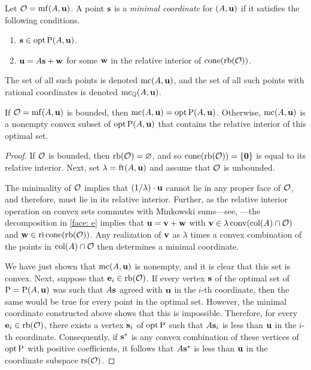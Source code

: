 \documentclass[11pt]{amsart}
\begin{document}
\begin{definition}
\label{mc: D} 
Let $\mathcal{O} = \operatorname{mf}(A, \mathbf{u})$.  A point $\mathbf{s}$ is a \emph{minimal coordinate} for $(A, \mathbf{u})$ if it satisfies the following conditions.
\begin{enumerate}
\item $\mathbf{s} \in \operatorname{opt} \mathrm{P}(A, \mathbf{u})$.
\item $\mathbf{u} = A \mathbf{s} + \mathbf{w}$ for some $\mathbf{w}$ in the relative interior of $\operatorname{cone} ( \operatorname{rb}(\mathcal{O}))$.  
\end{enumerate}

The set of all such points is denoted $\operatorname{mc}(A, \mathbf{u})$, and the set of all such points with rational coordinates is denoted $\operatorname{mc}_{\mathbb{Q}}(A, \mathbf{u})$.  
\end{definition}


\begin{proposition}  
\label{opt versus mc: P}  If $\mathcal{O} = \operatorname{mf}(A, \mathbf{u})$ is bounded, then $\operatorname{mc}(A, \mathbf{u}) = \operatorname{opt} \mathrm{P}(A, \mathbf{u})$.  Otherwise,  $\operatorname{mc}(A, \mathbf{u})$ is a nonempty convex subset of $\operatorname{opt} \mathrm{P}(A, \mathbf{u})$ that contains the relative interior of this optimal set. 
\end{proposition}

\begin{proof}    
If $\mathcal{O}$ is bounded, then $\operatorname{rb}(\mathcal{O}) = \varnothing$, and so $\operatorname{cone}( \operatorname{rb}(\mathcal{O})) = \{\mathbf{0} \}$ is equal to its relative interior.  Next, set $\lambda = \operatorname{ft}(A, \mathbf{u})$ and assume that $\mathcal{O}$ is unbounded.

 The minimality of $\mathcal{O}$ implies that $(1/\lambda)  \cdot \mathbf{u}$ cannot lie in any proper face of $\mathcal{O}$, and therefore, must lie in its relative interior.  Further, as the relative interior operation on convex sets commutes with Minkowski sums---see, \eg \cite[Theorem 4.10(b)]{vantiel.convex_analysis}---the decomposition in \eqref{face: e}  implies that $\mathbf{u} = \mathbf{v} + \mathbf{w}$ with $\mathbf{v} \in \lambda \operatorname{conv}(\operatorname{col}(A) \cap \mathcal{O})$ and $\mathbf{w} \in \operatorname{ri} \operatorname{cone}(\operatorname{rb}(\mathcal{O}))$.  Any realization of $\mathbf{v}$ as $\lambda$ times a convex combination of the points in $\operatorname{col}(A) \cap \mathcal{O}$ then determines a minimal coordinate.

We have just shown that $\operatorname{mc}(A, \mathbf{u})$ is nonempty, and it is clear that this set is convex.  Next,  suppose that $\mathbf{e}_i \in \operatorname{rb}(\mathcal{O})$.  If every vertex $\mathbf{s}$ of the optimal set of $\mathrm{P} = \mathrm{P}(A, \mathbf{u})$ was such that $A \mathbf{s}$ agreed with $\mathbf{u}$ in the $i$-th coordinate, then the same would be true for every point in the optimal set.   However, the minimal coordinate constructed above shows that this is impossible.  Therefore, for every $\mathbf{e}_i \in \operatorname{rb}(\mathcal{O})$, there exists a vertex $\mathbf{s}_i$ of $\operatorname{opt} \mathrm{P}$ such that $A \mathbf{s}_i$ is less than $\mathbf{u}$ in the $i$-th coordinate.  Consequently, if $\mathbf{s}^{\ast}$ is any convex combination of these vertices of $\operatorname{opt} \mathrm{P}$ with positive coefficients, it follows that $A \mathbf{s}^{\ast}$ is less than $\mathbf{u}$ in the coordinate subspace $\operatorname{rs}(\mathcal{O})$.  
\end{proof}
\end{document}
